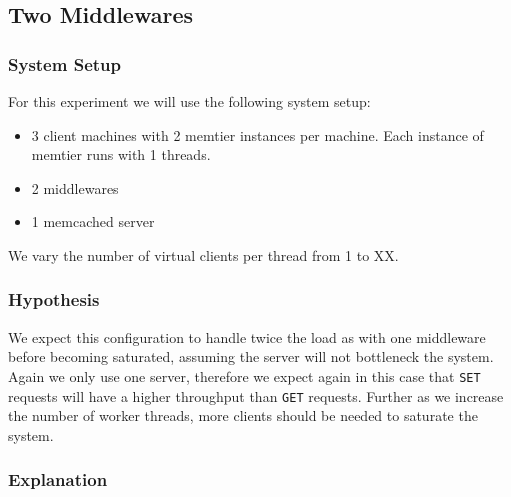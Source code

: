 \documentclass[11pt,a4paper]{article}
\begin{document}
\subsection{Two Middlewares}
%
\subsubsection{System Setup}
%
For this experiment we will use the following system setup:
%
\begin{itemize}
	\item 3 client machines with 2 memtier instances per machine. Each instance of memtier runs with 1 threads.
	\item 2 middlewares
	\item 1 memcached server
\end{itemize}
%
We vary the number of virtual clients per thread from 1 to XX.
%
\subsubsection{Hypothesis}
%
We expect this configuration to handle twice the load as with one middleware before becoming saturated, assuming the server will not bottleneck the system.
%
Again we only use one server, therefore we expect again in this case that \texttt{SET} requests will have a higher throughput than \texttt{GET} requests.
%
Further as we increase the number of worker threads, more clients should be needed to saturate the system.
%
\subsubsection{Explanation}
%
\end{document}

